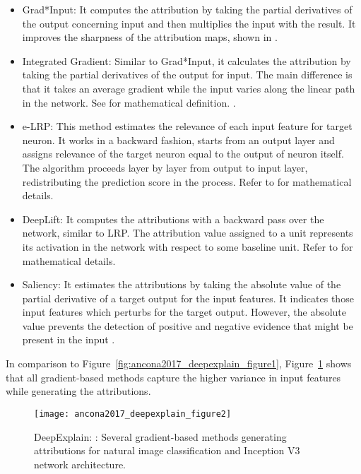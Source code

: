 \documentclass[english]{tktltiki2}
\theoremstyle{definition}
\theoremstyle{remark}
\begin{document}
\begin{itemize}
	\item Grad*Input: It computes the attribution by taking the partial derivatives of the output concerning input and then multiplies the input with the result. It improves the sharpness of the attribution maps, shown in \citep{shrikumar2016not}.
	
	\item Integrated Gradient: Similar to Grad*Input, it calculates the attribution by taking the partial derivatives of the output for input. The main difference is that it takes an average gradient while the input varies along the linear path in the network. See \citet{sundararajan2017axiomatic} for mathematical definition. .
	
	\item e-LRP: This method estimates the relevance of each input feature for target neuron. It works in a backward fashion, starts from an output layer and assigns relevance of the target neuron equal to the output of neuron itself. The algorithm proceeds layer by layer from output to input layer, redistributing the prediction score in the process. Refer to \citet{bach2015pixel} for mathematical details.
	
	\item DeepLift: It computes the attributions with a backward pass over the network, similar to LRP. The attribution value assigned to a unit represents its activation in the network with respect to some baseline unit. Refer to \citet{shrikumar2017learning} for mathematical details.
	
	\item Saliency: It estimates the attributions by taking the absolute value of the partial derivative of a target output for the input features. It indicates those input features which perturbs for the target output. However, the absolute value prevents the detection of positive and negative evidence that might be present in the input \citet{simonyan2013deep}.
\end{itemize}

In comparison to Figure~\ref{fig:ancona2017_deepexplain_figure1}, Figure~\ref{fig:ancona2017_deepexplain_figure2} shows that all gradient-based methods capture the higher variance in input features while generating the attributions. 

\begin{figure}[H]
	\texttt{[image: ancona2017\_deepexplain\_figure2]}
	\vspace*{-8mm}
	\caption{DeepExplain: \citep{ancona2017towards}: Several gradient-based methods generating attributions for natural image classification and Inception V3 network architecture.}
	\label{fig:ancona2017_deepexplain_figure2}
\end{figure}
\end{document}
